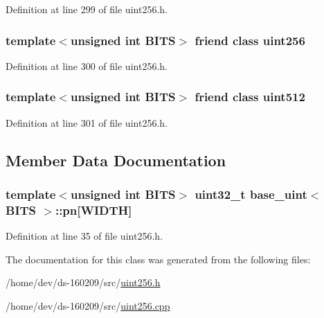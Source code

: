 Definition at line 299 of file uint256.\+h.

\hypertarget{classbase__uint_a2748616a40a1e4fdd6db14b92e9619e2}{}
\subsubsection[{uint256}]{\setlength{\rightskip}{0pt plus 5cm}template$<$unsigned int B\+I\+T\+S$>$ friend class {\bf uint256}\hspace{0.3cm}{\ttfamily [friend]}}\label{classbase__uint_a2748616a40a1e4fdd6db14b92e9619e2}


Definition at line 300 of file uint256.\+h.

\hypertarget{classbase__uint_a0d7ebbc9f372d8d9d46f50083d0aaad7}{}
\subsubsection[{uint512}]{\setlength{\rightskip}{0pt plus 5cm}template$<$unsigned int B\+I\+T\+S$>$ friend class {\bf uint512}\hspace{0.3cm}{\ttfamily [friend]}}\label{classbase__uint_a0d7ebbc9f372d8d9d46f50083d0aaad7}


Definition at line 301 of file uint256.\+h.



\subsection{Member Data Documentation}
\hypertarget{classbase__uint_a0edb1465d540fadd92b21659f27083a2}{}
\subsubsection[{pn}]{\setlength{\rightskip}{0pt plus 5cm}template$<$unsigned int B\+I\+T\+S$>$ {\bf uint32\+\_\+t} {\bf base\+\_\+uint}$<$ B\+I\+T\+S $>$\+::pn\mbox{[}{\bf W\+I\+D\+T\+H}\mbox{]}\hspace{0.3cm}{\ttfamily [protected]}}\label{classbase__uint_a0edb1465d540fadd92b21659f27083a2}


Definition at line 35 of file uint256.\+h.



The documentation for this class was generated from the following files\+:\begin{DoxyCompactItemize}
\item 
/home/dev/ds-\/160209/src/\hyperlink{uint256_8h}{uint256.\+h}\item 
/home/dev/ds-\/160209/src/\hyperlink{uint256_8cpp}{uint256.\+cpp}\end{DoxyCompactItemize}
